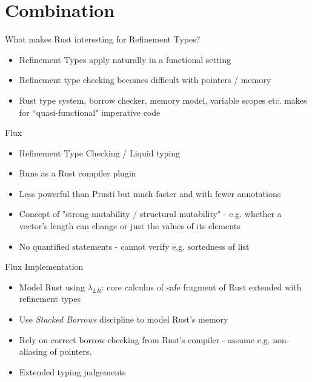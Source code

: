 \documentclass{beamer}
\begin{document}
\section{Combination}
\begin{frame}{What makes Rust interesting for Refinement Types?}
\begin{itemize}
\item Refinement Types apply naturally in a functional setting
\item Refinement type checking becomes difficult with pointers / memory
\item Rust type system, borrow checker, memory model, variable scopes etc. makes for ``quasi-functional" imperative code
\end{itemize} 
\begin{center}
\end{center}
\end{frame}


\begin{frame}{Flux} 
\begin{itemize}
\item Refinement Type Checking / Liquid typing
\item Runs as a Rust compiler plugin 
\item Less powerful than Prusti but much faster and with fewer annotations
\item Concept of "strong mutability / structural mutability" - e.g. whether a vector's length can change or just the values of its elements
\item No quantified statements - cannot verify e.g. sortedness of list
\end{itemize}
\end{frame}

\begin{frame}{Flux Implementation} 
\begin{itemize}
\item Model Rust using $\lambda_{LR}$: core calculus of safe fragment of Rust extended with refinement types
\item 
Use \emph{Stacked Borrows} discipline to model Rust's memory
\item 
Rely on correct borrow checking from Rust's compiler - assume e.g. non-aliasing of pointers.
\item Extended typing judgements
\end{itemize}
\end{frame}
\end{document}
